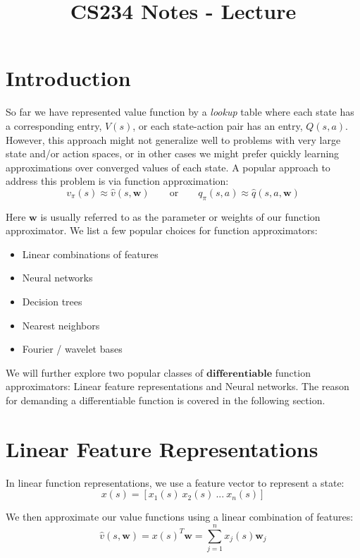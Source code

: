 \documentclass{article}
\title{CS234 Notes - Lecture \lecturenum \\ \lecturetitle }
\author{ \lecturescribe }
\newcommand{\w}{\mathbf{w}}
\begin{document}
\maketitle

\section{Introduction}
So far we have represented value function by a \textit{lookup} table where each state has a corresponding entry, $V(s)$, or each state-action pair has an entry, $Q(s,a)$. However, this approach might not generalize well to problems with very large state and/or action spaces, or in other cases we might prefer quickly learning approximations over converged values of each state. A popular approach to address this problem is via function approximation:
\begin{equation*}
v_{\pi} (s) \approx \hat{v} (s,\w)
\quad\quad\text{or}\quad\quad
q_{\pi} (s, a) \approx \hat{q} (s, a, \w)
\end{equation*}

Here $\w$ is usually referred to as the parameter or weights of our function approximator. We list a few popular choices for function approximators:

\begin{itemize}
  \item Linear combinations of features
  \item Neural networks
  \item Decision trees
  \item Nearest neighbors
  \item Fourier / wavelet bases
\end{itemize}

We will further explore two popular classes of $\mathbf{differentiable}$ function approximators: Linear feature representations and Neural networks. The reason for demanding a differentiable function is covered in the following section.

\section{Linear Feature Representations}
In linear function representations, we use a feature vector to represent a state:
\begin{equation*}
x(s) = [x_1(s)\ x_2(s)\ ...\ x_n(s)]
\end{equation*}

We then approximate our value functions using a linear combination of features:
\begin{equation*}
\hat{v} (s,\w) = x(s)^T \w=\sum_{j=1}^n x_j(s) \w_j
\end{equation*}
\end{document}
